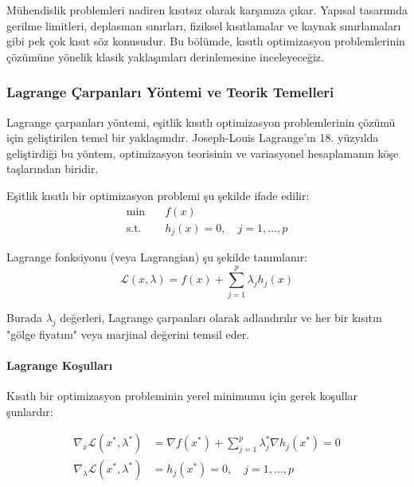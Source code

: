 Mühendislik problemleri nadiren kısıtsız olarak karşımıza çıkar. Yapısal tasarımda gerilme limitleri, deplasman sınırları, fiziksel kısıtlamalar ve kaynak sınırlamaları gibi pek çok kısıt söz konusudur. Bu bölümde, kısıtlı optimizasyon problemlerinin çözümüne yönelik klasik yaklaşımları derinlemesine inceleyeceğiz.

\subsubsection{Lagrange Çarpanları Yöntemi ve Teorik Temelleri}

Lagrange çarpanları yöntemi, eşitlik kısıtlı optimizasyon problemlerinin çözümü için geliştirilen temel bir yaklaşımdır. Joseph-Louis Lagrange'ın 18. yüzyılda geliştirdiği bu yöntem, optimizasyon teorisinin ve variasyonel hesaplamanın köşe taşlarından biridir.

Eşitlik kısıtlı bir optimizasyon problemi şu şekilde ifade edilir:
\begin{equation}
\begin{aligned}
\min & \quad f(x) \\
\text{s.t.} & \quad h_j(x) = 0, \quad j = 1, \ldots, p
\end{aligned}
\end{equation}

Lagrange fonksiyonu (veya Lagrangian) şu şekilde tanımlanır:
\begin{equation}
\mathcal{L}(x,\lambda) = f(x) + \sum_{j=1}^p \lambda_j h_j(x)
\end{equation}

Burada $\lambda_j$ değerleri, Lagrange çarpanları olarak adlandırılır ve her bir kısıtın "gölge fiyatını" veya marjinal değerini temsil eder.


\paragraph{Lagrange Koşulları}
Kısıtlı bir optimizasyon probleminin yerel minimumu için gerek koşullar şunlardır:

\begin{equation}
\begin{aligned}
\nabla_x \mathcal{L}(x^*,\lambda^*) &= \nabla f(x^*) + \sum_{j=1}^p \lambda_j^* \nabla h_j(x^*) = 0 \\
\nabla_{\lambda} \mathcal{L}(x^*,\lambda^*) &= h_j(x^*) = 0, \quad j = 1, \ldots, p
\end{aligned}
\end{equation}

